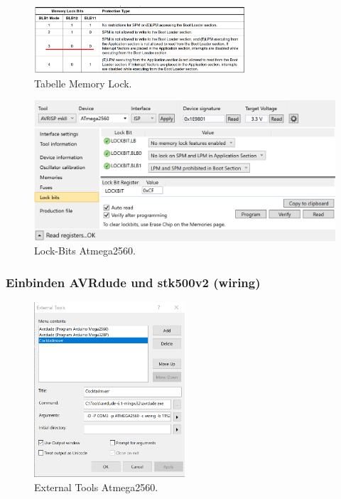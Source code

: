 
\begin{figure}[H]
	\centering
	\includegraphics[width=0.7\textwidth]{graphics/Tabelle_Memory_Lock}
	\caption{Tabelle Memory Lock.\cite[S.326]{atmel_atmel_2014}}
	\label{fig:Tabelle_Memory_Lock}
\end{figure}

\begin{figure}[H]
	\centering
	\includegraphics[width=\textwidth]{graphics/AtmelStudio_Locks}
	\caption{Lock-Bits Atmega2560.}
	\label{fig:AtmelStudio_Locks}
\end{figure}


\subsubsection{Einbinden AVRdude und stk500v2 (wiring)}\label{Appendix:AVR_STK500}

\begin{figure}[H]
	\centering
	\includegraphics[width=0.5\textwidth]{graphics/AtmelStudio_External_Tools}
	\caption{External Tools Atmega2560.}
	\label{fig:AtmelStudio_External_Tools}
\end{figure}

